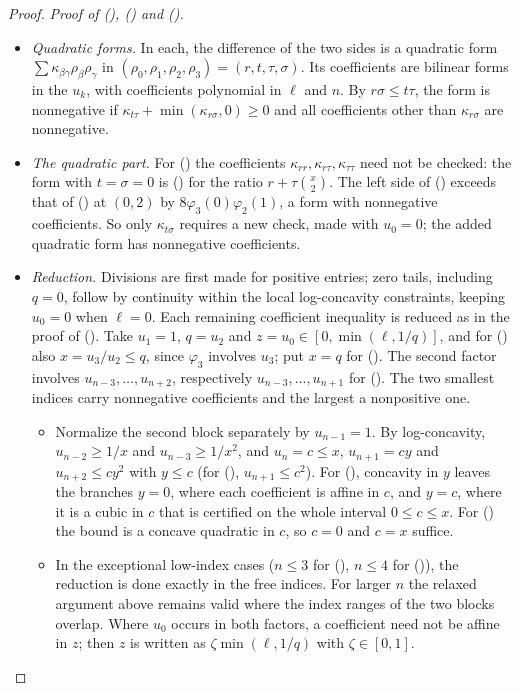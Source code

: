 \documentclass[twoside,10pt]{article}
\numberwithin{equation}{section}
\theoremstyle{slbody}
\theoremstyle{definition}
\theoremstyle{remark}
\renewcommand{\eqref}[1]{\textup{{\normalfont(\oldstylenums{\ref{#1}}}\normalfont)}}
\begin{document}
\begin{proof}
\emph{Proof of \eqref{eq:cubic-B}, \eqref{eq:cubic-corner} and \eqref{eq:cubic-E}.}
\begin{itemize}
\item \emph{Quadratic forms.} In each, the difference of the two sides is a quadratic form $\sum\kappa_{\beta\gamma}\rho_\beta\rho_\gamma$ in $(\rho_0,\rho_1,\rho_2,\rho_3)=(r,t,\tau,\sigma)$. Its coefficients are bilinear forms in the $u_k$, with coefficients polynomial in $\ell$ and $n$. By $r\sigma\leq t\tau$, the form is nonnegative if $\kappa_{t\tau}+\min(\kappa_{r\sigma},0)\geq0$ and all coefficients other than $\kappa_{r\sigma}$ are nonnegative.
\item \emph{The quadratic part.} For \eqref{eq:cubic-B} the coefficients $\kappa_{rr},\kappa_{r\tau},\kappa_{\tau\tau}$ need not be checked: the form with $t=\sigma=0$ is \eqref{eq:quad-B} for the ratio $r+\tau\binom x2$. The left side of \eqref{eq:cubic-corner} exceeds that of \eqref{eq:cubic-B} at $(0,2)$ by $8\varphi_3(0)\varphi_2(1)$, a form with nonnegative coefficients. So only $\kappa_{t\sigma}$ requires a new check, made with $u_0=0$; the added quadratic form has nonnegative coefficients.
\item \emph{Reduction.} Divisions are first made for positive entries; zero tails, including $q=0$, follow by continuity within the local log-concavity constraints, keeping $u_0=0$ when $\ell=0$. Each remaining coefficient inequality is reduced as in the proof of \eqref{eq:quad-B}. Take $u_1=1$, $q=u_2$ and $z=u_0\in[0,\min(\ell,1/q)]$, and for \eqref{eq:cubic-E} also $x=u_3/u_2\leq q$, since $\varphi_3$ involves $u_3$; put $x=q$ for \eqref{eq:cubic-B}. The second factor involves $u_{n-3},\ldots,u_{n+2}$, respectively $u_{n-3},\ldots,u_{n+1}$ for \eqref{eq:cubic-E}. The two smallest indices carry nonnegative coefficients and the largest a nonpositive one.
  \begin{itemize}
  \item Normalize the second block separately by $u_{n-1}=1$. By log-concavity, $u_{n-2}\geq1/x$ and $u_{n-3}\geq1/x^2$, and $u_n=c\leq x$, $u_{n+1}=cy$ and $u_{n+2}\leq cy^2$ with $y\leq c$ (for \eqref{eq:cubic-E}, $u_{n+1}\leq c^2$). For \eqref{eq:cubic-B}, concavity in $y$ leaves the branches $y=0$, where each coefficient is affine in $c$, and $y=c$, where it is a cubic in $c$ that is certified on the whole interval $0\leq c\leq x$. For \eqref{eq:cubic-E} the bound is a concave quadratic in $c$, so $c=0$ and $c=x$ suffice.
  \item In the exceptional low-index cases ($n\leq3$ for \eqref{eq:cubic-B}, $n\leq4$ for \eqref{eq:cubic-E}), the reduction is done exactly in the free indices. For larger $n$ the relaxed argument above remains valid where the index ranges of the two blocks overlap. Where $u_0$ occurs in both factors, a coefficient need not be affine in $z$; then $z$ is written as $\zeta\min(\ell,1/q)$ with $\zeta\in[0,1]$.

\end{itemize}
\end{itemize}
\end{proof}
\end{document}
